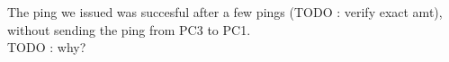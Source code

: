 The ping we issued was succesful after a few pings (TODO : verify exact amt), without sending the ping from PC3 to PC1.
\\
TODO : why?
